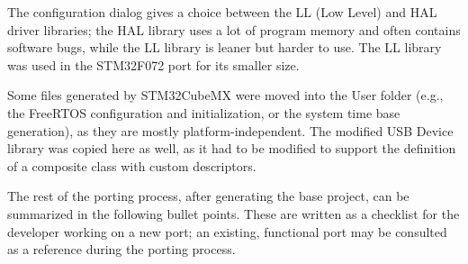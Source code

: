 The configuration dialog gives a choice between the LL (Low Level) and HAL driver libraries; the HAL library uses a lot of program memory and often contains software bugs, while the LL library is leaner but harder to use. The LL library was used in the STM32F072 port for its smaller size.

Some files generated by STM32CubeMX were moved into the User folder (e.g., the FreeRTOS configuration and initialization, or the system time base generation), as they are mostly platform-independent. The modified \gls{USB} Device library was copied here as well, as it had to be modified to support the definition of a composite class with custom descriptors.

The rest of the porting process, after generating the base project, can be summarized in the following bullet points. These are written as a checklist for the developer working on a new port; an existing, functional port may be consulted as a reference during the porting process.

